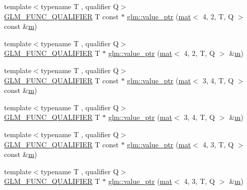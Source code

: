 \begin{DoxyCompactItemize}
\item 
{\footnotesize template$<$typename T , qualifier Q$>$ }\\\hyperlink{setup_8hpp_a33fdea6f91c5f834105f7415e2a64407}{G\+L\+M\+\_\+\+F\+U\+N\+C\+\_\+\+Q\+U\+A\+L\+I\+F\+I\+ER} T const  $\ast$ \hyperlink{group__gtc__type__ptr_gaf8be997c8fa6dea9773f195e35f2df05}{glm\+::value\+\_\+ptr} (\hyperlink{structglm_1_1mat}{mat}$<$ 4, 2, T, Q $>$ const \&\hyperlink{_s_d_l__opengl__glext_8h_af593500c283bf1a787a6f947f503a5c2}{m})
\item 
{\footnotesize template$<$typename T , qualifier Q$>$ }\\\hyperlink{setup_8hpp_a33fdea6f91c5f834105f7415e2a64407}{G\+L\+M\+\_\+\+F\+U\+N\+C\+\_\+\+Q\+U\+A\+L\+I\+F\+I\+ER} T $\ast$ \hyperlink{group__gtc__type__ptr_gabf9cfd331a42dd9feb54a5cbc858509a}{glm\+::value\+\_\+ptr} (\hyperlink{structglm_1_1mat}{mat}$<$ 4, 2, T, Q $>$ \&\hyperlink{_s_d_l__opengl__glext_8h_af593500c283bf1a787a6f947f503a5c2}{m})
\item 
{\footnotesize template$<$typename T , qualifier Q$>$ }\\\hyperlink{setup_8hpp_a33fdea6f91c5f834105f7415e2a64407}{G\+L\+M\+\_\+\+F\+U\+N\+C\+\_\+\+Q\+U\+A\+L\+I\+F\+I\+ER} T const  $\ast$ \hyperlink{group__gtc__type__ptr_gaf93bd83ae6520e9cdafdcd3f483dfeb3}{glm\+::value\+\_\+ptr} (\hyperlink{structglm_1_1mat}{mat}$<$ 3, 4, T, Q $>$ const \&\hyperlink{_s_d_l__opengl__glext_8h_af593500c283bf1a787a6f947f503a5c2}{m})
\item 
{\footnotesize template$<$typename T , qualifier Q$>$ }\\\hyperlink{setup_8hpp_a33fdea6f91c5f834105f7415e2a64407}{G\+L\+M\+\_\+\+F\+U\+N\+C\+\_\+\+Q\+U\+A\+L\+I\+F\+I\+ER} T $\ast$ \hyperlink{group__gtc__type__ptr_ga9b9841a59cedf4f06882863900c36787}{glm\+::value\+\_\+ptr} (\hyperlink{structglm_1_1mat}{mat}$<$ 3, 4, T, Q $>$ \&\hyperlink{_s_d_l__opengl__glext_8h_af593500c283bf1a787a6f947f503a5c2}{m})
\item 
{\footnotesize template$<$typename T , qualifier Q$>$ }\\\hyperlink{setup_8hpp_a33fdea6f91c5f834105f7415e2a64407}{G\+L\+M\+\_\+\+F\+U\+N\+C\+\_\+\+Q\+U\+A\+L\+I\+F\+I\+ER} T const  $\ast$ \hyperlink{group__gtc__type__ptr_ga50654758b47589e7dea0aa0bcb50adfb}{glm\+::value\+\_\+ptr} (\hyperlink{structglm_1_1mat}{mat}$<$ 4, 3, T, Q $>$ const \&\hyperlink{_s_d_l__opengl__glext_8h_af593500c283bf1a787a6f947f503a5c2}{m})
\item 
{\footnotesize template$<$typename T , qualifier Q$>$ }\\\hyperlink{setup_8hpp_a33fdea6f91c5f834105f7415e2a64407}{G\+L\+M\+\_\+\+F\+U\+N\+C\+\_\+\+Q\+U\+A\+L\+I\+F\+I\+ER} T $\ast$ \hyperlink{group__gtc__type__ptr_gad33202dd8b191c31df6ed81b63bc2e52}{glm\+::value\+\_\+ptr} (\hyperlink{structglm_1_1mat}{mat}$<$ 4, 3, T, Q $>$ \&\hyperlink{_s_d_l__opengl__glext_8h_af593500c283bf1a787a6f947f503a5c2}{m})

\end{DoxyCompactItemize}
